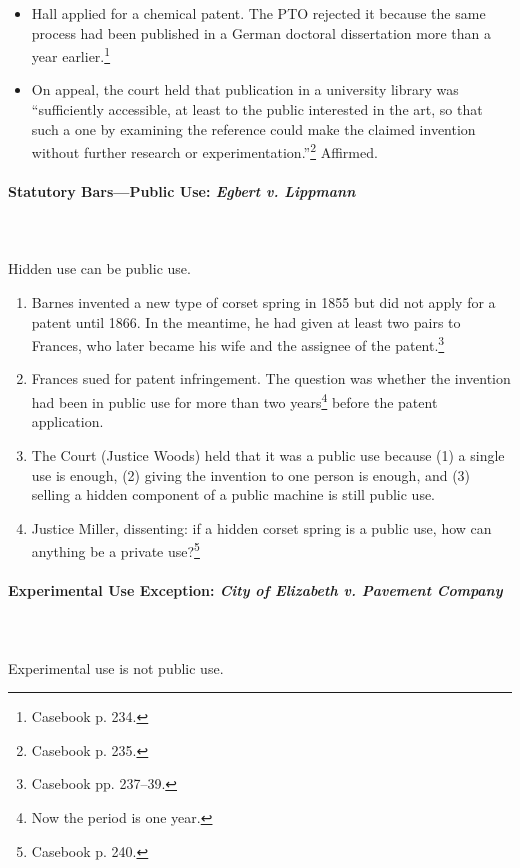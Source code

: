 \begin{itemize}
    \item Hall applied for a chemical patent. The PTO rejected it because the 
    same process had been published in a German doctoral dissertation more than 
    a year earlier.\footnote{Casebook p. 234.}
    \item On appeal, the court held that publication in a university library was 
    ``sufficiently accessible, at least to the public interested in the art, so 
    that such a one by examining the reference could make the claimed invention 
    without further research or experimentation.''\footnote{Casebook p. 235.} 
    Affirmed.
\end{itemize}

\paragraph{Statutory Bars---Public Use: \emph{Egbert v. Lippmann}}
~\\\\
Hidden use can be public use.

\begin{enumerate}
    \item Barnes invented a new type of corset spring in 1855 but did not apply 
    for a patent until 1866. In the meantime, he had given at least two pairs to 
    Frances, who later became his wife and the assignee of the 
    patent.\footnote{Casebook pp. 237--39.}
    \item Frances sued for patent infringement. The question was whether the 
    invention had been in public use for more than two years\footnote{Now the 
    period is one year.} before the patent application.
    \item The Court (Justice Woods) held that it was a public use because (1) a 
    single use is enough, (2) giving the invention to one person is enough, and 
    (3) selling a hidden component of a public machine is still public use.
    \item Justice Miller, dissenting: if a hidden corset spring is a public use, 
    how can anything be a private use?\footnote{Casebook p. 240.}
\end{enumerate}

\paragraph{Experimental Use Exception: \emph{City of Elizabeth v. Pavement 
Company}}
~\\\\
Experimental use is not public use.

